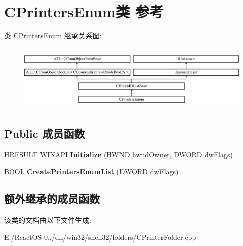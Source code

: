 \hypertarget{class_c_printers_enum}{}\section{C\+Printers\+Enum类 参考}
\label{class_c_printers_enum}
类 C\+Printers\+Enum 继承关系图\+:\begin{figure}[H]
\begin{center}
\leavevmode
\includegraphics[height=3.181818cm]{class_c_printers_enum}
\end{center}
\end{figure}
\subsection*{Public 成员函数}
\begin{DoxyCompactItemize}
\item 
\mbox{\label{class_c_printers_enum_a7c0e4d1a9f96d71a3dafd822a31557c7}} 
H\+R\+E\+S\+U\+LT W\+I\+N\+A\+PI {\bfseries Initialize} (\hyperlink{interfacevoid}{H\+W\+ND} hwnd\+Owner, D\+W\+O\+RD dw\+Flags)
\item 
\mbox{\label{class_c_printers_enum_ad08adca71acc47a5a9a9071e49ae3a76}} 
B\+O\+OL {\bfseries Create\+Printers\+Enum\+List} (D\+W\+O\+RD dw\+Flags)
\end{DoxyCompactItemize}
\subsection*{额外继承的成员函数}


该类的文档由以下文件生成\+:\begin{DoxyCompactItemize}
\item 
E\+:/\+React\+O\+S-\/0../dll/win32/shell32/folders/C\+Printer\+Folder.\+cpp\end{DoxyCompactItemize}
